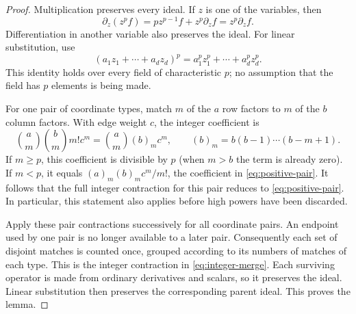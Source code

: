\documentclass[11pt,reqno]{amsart}
\theoremstyle{remark}
\numberwithin{equation}{section}
\begin{document}
\begin{proof}
Multiplication preserves every ideal. If $z$ is one of the variables,
then
\[
 \partial_z(z^pf)=p z^{p-1}f+z^p\partial_zf
                =z^p\partial_zf.
\]
Differentiation in another variable also preserves the ideal. For
linear substitution, use
\[
 (a_1z_1+\cdots+a_dz_d)^p
        =a_1^pz_1^p+\cdots+a_d^pz_d^p.
\]
This identity holds over every field of characteristic $p$; no
assumption that the field has $p$ elements is being made.

For one pair of coordinate types, match $m$ of the $a$ row factors to
$m$ of the $b$ column factors. With edge weight $c$, the integer
coefficient is
\begin{equation}\label{eq:positive-integer-pair}
 \binom{a}{m}\binom{b}{m}m!c^m
   =\binom{a}{m}(b)_m c^m,
 \qquad (b)_m=b(b-1)\cdots(b-m+1).
\end{equation}
If $m\geq p$, this coefficient is divisible by $p$ (when $m>b$
the term is already zero). If $m<p$, it equals
$(a)_m(b)_m c^m/m!$, the coefficient in \eqref{eq:positive-pair}. It follows
that the full integer contraction for this pair reduces to
\eqref{eq:positive-pair}. In particular, this statement also applies before
high powers have been discarded.

Apply these pair contractions successively for all coordinate pairs.
An endpoint used by one pair is no longer available to a later pair.
Consequently each set of disjoint matches is counted once, grouped
according to its numbers of matches of each type. This is the
integer contraction in \eqref{eq:integer-merge}. Each surviving operator is
made from ordinary derivatives and scalars, so it preserves the
ideal. Linear substitution then preserves the corresponding parent
ideal. This proves the lemma.
\end{proof}
\end{document}
